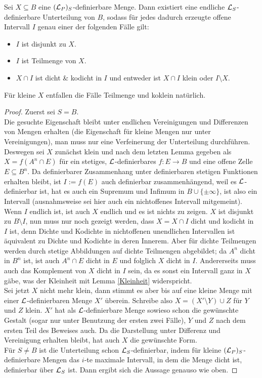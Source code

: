 \begin{theorem}\label{Satz 4}
	Sei $X\subseteq B$ eine $(\mathcal{L}_P)_S$-definierbare Menge. Dann existiert eine endliche $\mathcal{L}_S$-definierbare Unterteilung von $B$, sodass für jedes dadurch erzeugte offene Intervall $I$ genau einer der folgenden Fälle gilt:
	\begin{itemize}
		\item $I$ ist disjunkt zu $X$.
		\item $I$ ist Teilmenge von $X$.
		\item $X\cap I$ ist dicht \& kodicht in $I$ und entweder ist $X\cap I$ klein oder $I\setminus X$.
	\end{itemize}
	Für kleine $X$ entfallen die Fälle \glqq{}Teilmenge\grqq{} und \glqq{}koklein\grqq{} natürlich.
\end{theorem}
\begin{proof}
	Zuerst sei $S=B$.\\
	Die gesuchte Eigenschaft bleibt unter endlichen Vereinigungen und Differenzen von Mengen erhalten (die Eigenschaft für kleine Mengen nur unter Vereinigungen), man muss nur eine Verfeinerung der Unterteilung durchführen. Deswegen sei $X$ zunächst klein und nach dem letzten Lemma gegeben als $X=f(A^n\cap E)$ für ein stetiges, $\mathcal{L}$-definierbares $f:E\rightarrow B$ und eine offene Zelle $E\subseteq B^n$. Da definierbarer Zusammenhang unter definierbaren stetigen Funktionen erhalten bleibt, ist $I:=f(E)$ auch definierbar zusammenhängend, weil es $\mathcal{L}$-definierbar ist, hat es auch ein Supremum und Infimum in $B\cup\{\pm\infty\}$, ist also ein Intervall (ausnahmsweise sei hier auch ein nichtoffenes Intervall mitgemeint). Wenn $I$ endlich ist, ist auch $X$ endlich und es ist nichts zu zeigen. $X$ ist disjunkt zu $B\setminus I$, nun muss nur noch gezeigt werden, dass $X=X\cap I$ dicht und kodicht in $I$ ist, denn Dichte und Kodichte in nichtoffenen unendlichen Intervallen ist äquivalent zu Dichte und Kodichte in deren Innerem. Aber für dichte Teilmengen werden durch stetige Abbildungen auf dichte Teilmengen abgebildet; da $A^n$ dicht in $B^n$ ist, ist auch $A^n\cap E$ dicht in $E$ und folglich $X$ dicht in $I$. Andererseits muss auch das Komplement von $X$ dicht in $I$ sein, da es sonst ein Intervall ganz in $X$ gäbe, was der Kleinheit mit Lemma \ref{Kleinheit} widerspricht.\\
	Sei jetzt $X$ nicht mehr klein, dann stimmt es aber bis auf eine kleine Menge mit einer $\mathcal{L}$-definierbaren Menge $X'$ überein. Schreibe also $X=(X'\setminus Y)\cup Z$ für $Y$ und $Z$ klein. $X'$ hat als $\mathcal{L}$-definierbare Menge sowieso schon die gewünschte Gestalt (sogar nur unter Benutzung der ersten zwei Fälle), $Y$ und $Z$ nach dem ersten Teil des Beweises auch. Da die Darstellung unter Differenz und Vereinigung erhalten bleibt, hat auch $X$ die gewünschte Form.\\
	Für $S\neq B$ ist die Unterteilung schon $\mathcal{L}_S$-definierbar, indem für kleine $(\mathcal{L}_P)_S$-definierbare Mengen das $i$-te maximale Intervall, in dem die Menge dicht ist, definierbar über $\mathcal{L}_S$ ist. Dann ergibt sich die Aussage genauso wie oben.
\end{proof}

